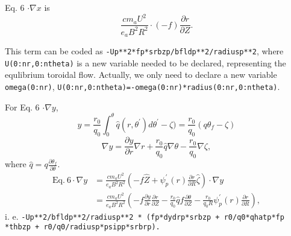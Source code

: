 \documentclass[12pt]{article}
\begin{document}
\begin{CJK*}{UTF8}{gbsn}
Eq. 6 $\cdot \nabla x$ is
\begin{equation}
    \frac{cm_aU^2}{e_aB^2R^2} \cdot (-f) \frac{\partial r}{\partial Z}.
\end{equation}

This term can be coded as \texttt{-Up**2*fp*srbzp/bfldp**2/radiusp**2}, where \texttt{U(0:nr,0:ntheta)} is a new variable needed to be declared, representing the equlibrium toroidal flow. 
Actually, we only need to declare a new variable \texttt{omega(0:nr)}, \texttt{U(0:nr,0:ntheta)=-omega(0:nr)*radius(0:nr,0:ntheta)}.

For Eq. 6 $\cdot \nabla y$, 
\begin{equation}
    y = \frac{r_0}{q_0}\int_{0}^{\theta}\hat{q}(r,\theta^{'})d\theta^{'}-\zeta)=\frac{r_0}{q_0}(q\theta_f-\zeta)
\end{equation}
\begin{equation}
    \nabla y = \frac{\partial y}{\partial r} \nabla r + \frac{r_0}{q_0} \hat{q} \nabla \theta - \frac{r_0}{q_0} \nabla \zeta,\label{eqdely}
\end{equation}
where $\hat{q} = q \frac{\partial \theta_f}{\partial \theta}$. 
\begin{equation}
\begin{split}
    \textrm{Eq.}\ 6 \cdot \nabla y &= \frac{cm_aU^2}{e_aB^2R^2}(-f\hat{Z} + \psi_p^{'}(r)\frac{\partial r}{\partial R} \hat{\zeta}) \cdot \nabla y \\
                                   &= \frac{cm_aU^2}{e_aB^2R^2}(-f \frac{\partial y}{\partial r} \frac{\partial r}{\partial Z} - \frac{r_0}{q_0} \hat{q} f 
                                      \frac{\partial \theta}{\partial Z} - \frac{r_0}{q_0R} \psi_p^{'}(r)\frac{\partial r}{\partial R}), 
\end{split}
\end{equation}
i. e. \texttt{-Up**2/bfldp**2/radiusp**2 * (fp*dydrp*srbzp + r0/q0*qhatp*fp\\ *thbzp + r0/q0/radiusp*psipp*srbrp).}


\end{CJK*}
\end{document}
